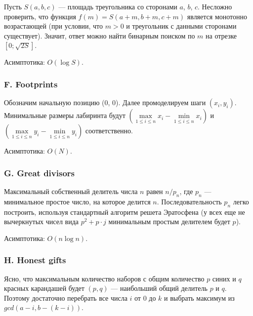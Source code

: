 
Пусть $S(a, b, c)$ --- площадь треугольника со сторонами $a$, $b$, $c$. Несложно проверить, что функция $f(m) = S(a + m, b + m, c + m)$ является монотонно возрастающей (при условии, что $m > 0$ и треугольник с данными сторонами существует). Значит, ответ можно найти бинарным поиском по $m$ на отрезке $[0; \sqrt{2 S}]$.

Асимптотика: $O(\log S)$.



\subsubsection*{F. Footprints} 


Обозначим начальную позицию (0, 0). Далее промоделируем шаги $(x_i, y_i)$. Минимальные размеры лабиринта будут $(\max\limits_{1 \leqslant i \leqslant n} x_i - \min\limits_{1 \leqslant i \leqslant n} x_i)$ и $(\max\limits_{1 \leqslant i \leqslant n} y_i - \min\limits_{1 \leqslant i \leqslant n} y_i)$ соответственно.

Асимптотика: $O(N)$.



\subsubsection*{G. Great divisors} 


Максимальный собственный делитель числа $n$ равен $n / p_n$, где $p_n$ --- минимальное простое число, на которое делится $n$. Последовательность $p_n$ легко построить, используя стандартный алгоритм решета Эратосфена (у всех еще не вычеркнутых чисел вида $p^2 + p \cdot j$ минимальным простым делителем будет $p$).

Асимптотика: $O(n \log n)$.



\subsubsection*{H. Honest gifts} 


Ясно, что максимальным количество наборов с общим количество $p$ синих и $q$ красных карандашей будет $(p, q)$ --- наибольший общий делитель $p$ и $q$. Поэтому достаточно перебрать все числа $i$ от 0 до $k$ и выбрать максимум из $gcd(a - i, b - (k - i))$.

